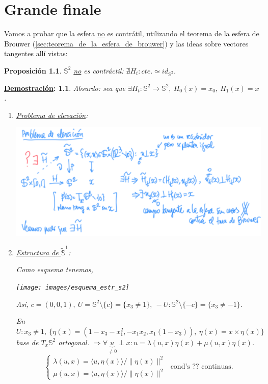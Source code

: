 \documentclass[10pt,a4paper,openright]{book}
\theoremstyle{break}
\newtheorem*{prop}{Proposición}
\newtheorem*{demo}{\underline{Demostración}:}
\begin{document}
\chapter{Grande finale}%
\label{cha:grande_finale}
Vamos a probar que la esfera \underline{no} es contrátil, utilizando el teorema de la esfera de Brouwer (\ref{sec:teorema_de_la_esfera_de_brouwer}) y las ideas sobre vectores tangentes allí vistas:
\begin{prop}
$\mathbb{S}^{2}$ \underline{no} es contráctil: $\nexists H_t: cte. \simeq id_{\mathbb{S}^{2}}$.
\end{prop}
\begin{demo}
Absurdo: sea que $\exists H_t: \mathbb{S}^{2} \rightarrow \mathbb{S}^{2},\ H_0\left( x \right) = x_0,\ H_1\left( x \right) = x$.
\begin{enumerate}
    \item \underline{Problema de elevación}:
    \begin{center}
        \includegraphics[scale=0.3]{images/prob_elevacion} 
    \end{center}

    \item \underline{Estructura de }$\tilde{\mathbb{S}}^1$: 

    Como esquema tenemos,
    \begin{center}
        \texttt{[image: images/esquema\_estr\_s2]} 
    \end{center}
    Así,
        $c = \left( 0, 0, 1 \right),\ U = \mathbb{S}^{2} \setminus \{c\} = \{x_3 \neq 1\},\ -U : \mathbb{S}^{2} \setminus \{-c\} = \{x_3 \neq -1\}$.

    En $U: x_3 \neq 1,\ \{\eta\left( x \right) = \left( 1 - x_3 - x_1^2, -x_1x_2, x_1\left( 1- x_3 \right) \right),\ \eta\left( x \right) = x \times \eta\left( x \right)\}$ base de $T_x\mathbb{S}^{2}$ ortogonal. $\Rightarrow \forall \underbrace{u}_{\neq 0} \perp x: u = \lambda\left( u, x \right) \eta\left( x \right) + \mu\left( u, x \right) \eta\left( x \right)$.
    \[
    \begin{cases}
        \lambda\left( u, x \right) = \langle u, \eta\left( x \right) \rangle / \lVert \eta\left( x \right) \rVert^2\\
        \mu\left( u, x \right) = \langle u, \eta\left( x \right) \rangle / \lVert \eta\left( x \right) \rVert^2
    \end{cases} \text{ cond's ?? continuas.} 
    \]


\end{enumerate}
\end{demo}
\end{document}
